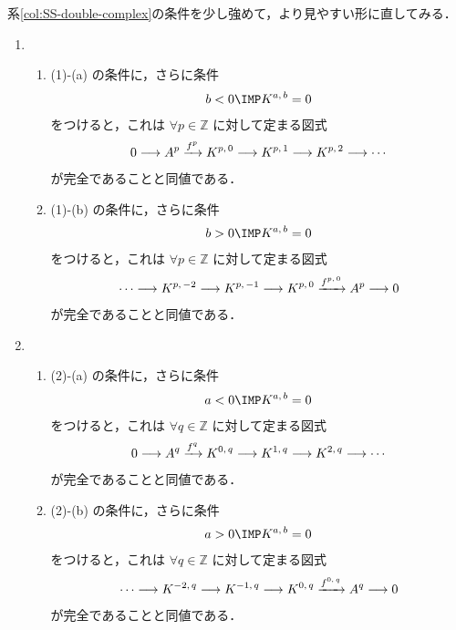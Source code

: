 \documentclass[algtopo_main]{subfiles}
\begin{document}
\begin{marker}
    系\ref{col:SS-double-complex}の条件を少し強めて，より見やすい形に直してみる．
    \begin{enumerate}
        \item 
        \begin{enumerate}
            \item (1)-(a) の条件に，さらに条件
            \begin{align}
                b < 0 \IMP K^{a,\, b} = 0
            \end{align}
            をつけると，これは $\forall p \in \mathbb{Z}$ に対して定まる図式
            \begin{align}
                0 \longrightarrow A^p \xrightarrow{f^p} K^{p,\, 0} \longrightarrow K^{p,\, 1} \longrightarrow K^{p,\, 2} \longrightarrow \cdots
            \end{align}
            が完全であることと同値である．
            \item (1)-(b) の条件に，さらに条件
            \begin{align}
                b > 0 \IMP K^{a,\, b} = 0
            \end{align}
            をつけると，これは $\forall p \in \mathbb{Z}$ に対して定まる図式
            \begin{align}
                \cdots \longrightarrow K^{p,\, -2} \longrightarrow K^{p,\, -1} \longrightarrow K^{p,\, 0} \xrightarrow{f^{p,\, 0}} A^p \longrightarrow 0
            \end{align}
            が完全であることと同値である．
        \end{enumerate}
        \item 
        \begin{enumerate}
            \item (2)-(a) の条件に，さらに条件
            \begin{align}
                a < 0 \IMP K^{a,\, b} = 0
            \end{align}
            をつけると，これは $\forall q \in \mathbb{Z}$ に対して定まる図式
            \begin{align}
                0 \longrightarrow A^q \xrightarrow{f^q} K^{0,\, q} \longrightarrow K^{1,\, q} \longrightarrow K^{2,\, q} \longrightarrow \cdots
            \end{align}
            が完全であることと同値である．
            \item (2)-(b) の条件に，さらに条件
            \begin{align}
                a > 0 \IMP K^{a,\, b} = 0
            \end{align}
            をつけると，これは $\forall q \in \mathbb{Z}$ に対して定まる図式
            \begin{align}
                \cdots \longrightarrow K^{-2,\, q} \longrightarrow K^{-1,\, q} \longrightarrow K^{0,\, q} \xrightarrow{f^{0,\, q}} A^q \longrightarrow 0
            \end{align}
            が完全であることと同値である．
        \end{enumerate}
    \end{enumerate}
\end{marker}
\end{document}
